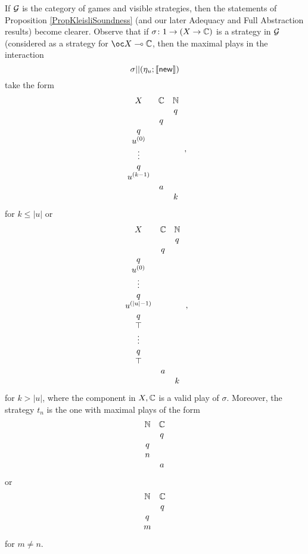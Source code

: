 \documentclass{article}
\begin{document}
If $\mathcal G$ is the category of games and visible strategies, then the statements of Proposition \ref{PropKleisliSoundness} (and our later Adequacy and Full Abstraction results) become clearer.  
Observe that if $\sigma \colon 1 \to (X \to \mathbb{C})$ is a strategy in $\mathcal G$ (considered as a strategy for $\oc X \implies \bC$, then the maximal plays in the interaction
\[
  \sigma || (\eta_u;\left\llbracket\operatorname{{\mathsf{new}}}\right\rrbracket)
  \]
take the form
\[
  \begin{array}{ccc}
    X         & \mathbb{C} & \mathbb{N} \\
              &     &  q  \\
              &  q  &     \\
    q         &     &     \\
    u^{(0)}   &     &     \\
    \vdots    &     &     \\
    q         &     &     \\
    u^{(k-1)} &     &     \\
              &  a  &     \\
              &     &  k  \\
  \end{array}\,,
  \]
for $k\le |u|$ or
\[
  \begin{array}{ccc}
    X         & \mathbb{C} & \mathbb{N} \\
              &     &  q  \\
              &  q  &     \\
    q         &     &     \\
    u^{(0)}   &     &     \\
    \vdots    &     &     \\
    q         &     &     \\
    u^{(|u|-1)}&     &     \\
    q         &     &     \\
    \top      &     &     \\
    \vdots    &     &     \\
    q         &     &     \\
    \top      &     &     \\
              &  a  &     \\
              &     &  k  \\
  \end{array}\,,
  \]
for $k>|u|$, where the component in $X,\mathbb{C}$ is a valid play of $\sigma$.
Moreover, the strategy $t_n$ is the one with maximal plays of the form
\[
  \begin{array}{cc}
    \mathbb{N} & \mathbb{C} \\
        &  q  \\
    q   &     \\
    n   &     \\
        &  a
  \end{array}
  \]
or
\[
  \begin{array}{cc}
    \mathbb{N} & \mathbb{C} \\
        &  q  \\
    q   &     \\
    m   &
  \end{array}
  \]
for $m\ne n$.
\end{document}
